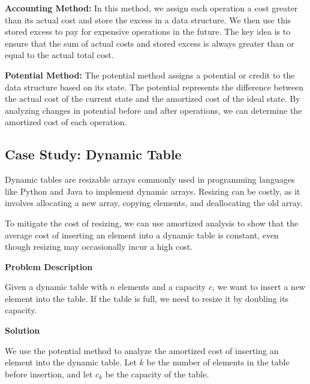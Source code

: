 \documentclass[12pt]{book} %
\begin{document}
\textbf{Accounting Method:} In this method, we assign each operation a cost greater than its actual cost and store the excess in a data structure. We then use this stored excess to pay for expensive operations in the future. The key idea is to ensure that the sum of actual costs and stored excess is always greater than or equal to the actual total cost.

\textbf{Potential Method:} The potential method assigns a potential or credit to the data structure based on its state. The potential represents the difference between the actual cost of the current state and the amortized cost of the ideal state. By analyzing changes in potential before and after operations, we can determine the amortized cost of each operation.

\subsection{Case Study: Dynamic Table}
Dynamic tables are resizable arrays commonly used in programming languages like Python and Java to implement dynamic arrays. Resizing can be costly, as it involves allocating a new array, copying elements, and deallocating the old array.

To mitigate the cost of resizing, we can use amortized analysis to show that the average cost of inserting an element into a dynamic table is constant, even though resizing may occasionally incur a high cost.

\textbf{Problem Description}

Given a dynamic table with \(n\) elements and a capacity \(c\), we want to insert a new element into the table. If the table is full, we need to resize it by doubling its capacity.


\textbf{Solution}

We use the potential method to analyze the amortized cost of inserting an element into the dynamic table. Let \(k\) be the number of elements in the table before insertion, and let \(c_k\) be the capacity of the table.
\FloatBarrier
\end{document}
